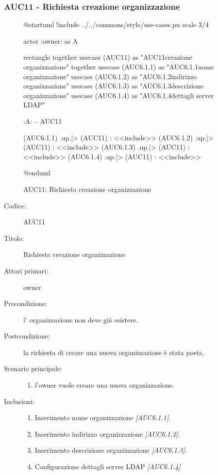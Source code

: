 \documentclass[casi-duso]{subfiles}
\begin{document}
\subsubsection{AUC11 - Richiesta creazione organizzazione}%
\label{subsub:AUC11}

\begin{figure}[h!]
  \centering
  \begin{plantuml}
  @startuml
  !include ../../commons/style/use-cases.pu
  scale 3/4

  actor :owner: as A

  rectangle {
    together {
      usecase (AUC11) as "AUC11\nRichiesta creazione organizzazione"
    }
    together {
      usecase (AUC6.1.1) as "AUC6.1.1\nInserisci nome organizzazione"
      usecase (AUC6.1.2) as "AUC6.1.2\nInserisci indirizzo organizzazione"
      usecase (AUC6.1.3) as "AUC6.1.3\nInserisci descrizione organizzazione"
      usecase (AUC6.1.4) as "AUC6.1.4\nConfigurazione dettagli server LDAP"
    }
  }

  :A: -- AUC11

  (AUC6.1.1) .up.|> (AUC11) : <<include>>
  (AUC6.1.2) .up.|> (AUC11) : <<include>>
  (AUC6.1.3) .up.|> (AUC11) : <<include>>
  (AUC6.1.4) .up.|> (AUC11) : <<include>>

  @enduml
  \end{plantuml}
  \caption{AUC11: Richiesta creazione organizzazione}
  \label{fig:auc11}
\end{figure}

\begin{description}
  \item[Codice:] AUC11
  \item[Titolo:] Richiesta creazione organizzazione
  \item[Attori primari:] owner
  \item[Precondizione:] l' organizzazione non deve già esistere.
  \item[Postcondizione:] la richiesta di creare una nuova organizzazione è stata posta.
  \item[Scenario principale:]
  \begin{enumerate}
    \item l'owner vuole creare una nuova organizzazione.
  \end{enumerate}
  \item[Inclusioni:]
  \begin{enumerate}
    \item Inserimento nome organizzazione \emph{[AUC6.1.1]}.
    \item Inserimento indirizzo organizzazione \emph{[AUC6.1.2]}.
    \item Inserimento descrizione organizzazione \emph{[AUC6.1.3]}.
    \item Configurazione dettagli server LDAP \emph{[AUC6.1.4]}
  \end{enumerate}
\end{description}
\end{document}
